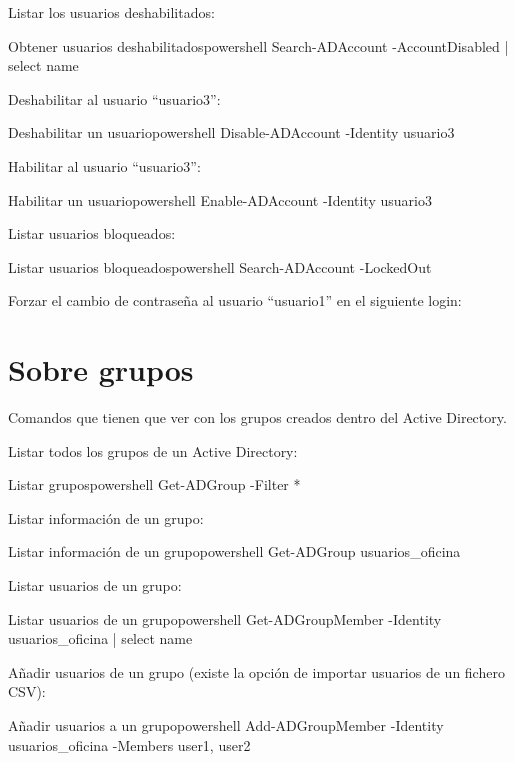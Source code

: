 Listar los  usuarios deshabilitados:
\begin{mycode}{Obtener usuarios deshabilitados}{powershell}{}
Search-ADAccount -AccountDisabled | select name
\end{mycode}

Deshabilitar al usuario “usuario3”:
\begin{mycode}{Deshabilitar un usuario}{powershell}{}
Disable-ADAccount -Identity usuario3
\end{mycode}


Habilitar al usuario “usuario3”:
\begin{mycode}{Habilitar un usuario}{powershell}{}
Enable-ADAccount -Identity usuario3
\end{mycode}

Listar usuarios bloqueados:
\begin{mycode}{Listar usuarios bloqueados}{powershell}{}
Search-ADAccount -LockedOut
\end{mycode}

Forzar el cambio de contraseña al usuario “usuario1” en el siguiente login:


\section{Sobre grupos}
Comandos que tienen que ver con los grupos creados dentro del Active Directory.

Listar todos los grupos de un Active Directory:
\begin{mycode}{Listar grupos}{powershell}{}
Get-ADGroup -Filter *
\end{mycode}

Listar información de un grupo:
\begin{mycode}{Listar información de un grupo}{powershell}{}
Get-ADGroup usuarios_oficina
\end{mycode}

Listar usuarios de un grupo:
\begin{mycode}{Listar usuarios de un grupo}{powershell}{}
Get-ADGroupMember -Identity usuarios_oficina | select name
\end{mycode}

Añadir usuarios de un grupo (existe la opción de importar usuarios de un fichero CSV):
\begin{mycode}{Añadir usuarios a un grupo}{powershell}{}
Add-ADGroupMember -Identity usuarios_oficina -Members user1, user2
\end{mycode}



